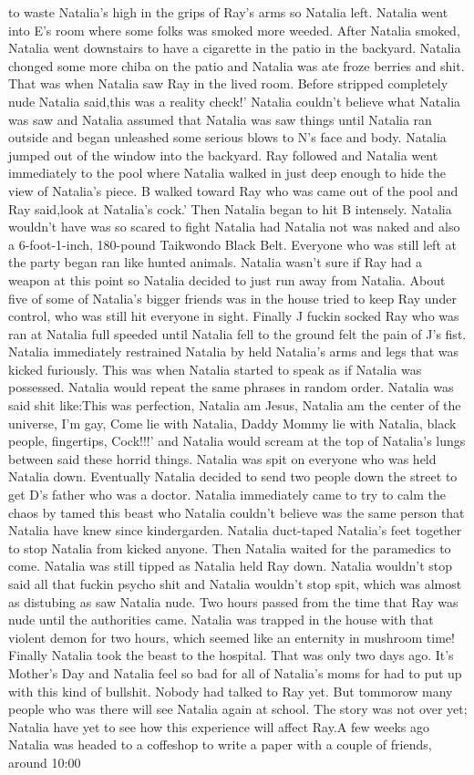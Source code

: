 \documentclass[12pt]{book}
\begin{document}
to waste Natalia's high in the grips of Ray's arms so Natalia left. Natalia went into E's room where some folks was smoked more weeded. After Natalia smoked, Natalia went downstairs to have a cigarette in the patio in the backyard. Natalia chonged some more chiba on the patio and Natalia was ate froze berries and shit. That was when Natalia saw Ray in the lived room. Before stripped completely nude Natalia said,this was a reality check!' Natalia couldn't believe what Natalia was saw and Natalia assumed that Natalia was saw things until Natalia ran outside and began unleashed some serious blows to N's face and body. Natalia jumped out of the window into the backyard. Ray followed and Natalia went immediately to the pool where Natalia walked in just deep enough to hide the view of Natalia's piece. B walked toward Ray who was came out of the pool and Ray said,look at Natalia's cock.' Then Natalia began to hit B intensely. Natalia wouldn't have was so scared to fight Natalia had Natalia not was naked and also a 6-foot-1-inch, 180-pound Taikwondo Black Belt. Everyone who was still left at the party began ran like hunted animals. Natalia wasn't sure if Ray had a weapon at this point so Natalia decided to just run away from Natalia. About five of some of Natalia's bigger friends was in the house tried to keep Ray under control, who was still hit everyone in sight. Finally J fuckin socked Ray who was ran at Natalia full speeded until Natalia fell to the ground felt the pain of J's fist. Natalia immediately restrained Natalia by held Natalia's arms and legs that was kicked furiously. This was when Natalia started to speak as if Natalia was possessed. Natalia would repeat the same phrases in random order. Natalia was said shit like:This was perfection, Natalia am Jesus, Natalia am the center of the universe, I'm gay, Come lie with Natalia, Daddy Mommy lie with Natalia, black people, fingertips, Cock!!!' and Natalia would scream at the top of Natalia's lungs between said these horrid things. Natalia was spit on everyone who was held Natalia down. Eventually Natalia decided to send two people down the street to get D's father who was a doctor. Natalia immediately came to try to calm the chaos by tamed this beast who Natalia couldn't believe was the same person that Natalia have knew since kindergarden. Natalia duct-taped Natalia's feet together to stop Natalia from kicked anyone. Then Natalia waited for the paramedics to come. Natalia was still tipped as Natalia held Ray down. Natalia wouldn't stop said all that fuckin psycho shit and Natalia wouldn't stop spit, which was almost as distubing as saw Natalia nude. Two hours passed from the time that Ray was nude until the authorities came. Natalia was trapped in the house with that violent demon for two hours, which seemed like an enternity in mushroom time! Finally Natalia took the beast to the hospital. That was only two days ago. It's Mother's Day and Natalia feel so bad for all of Natalia's moms for had to put up with this kind of bullshit. Nobody had talked to Ray yet. But tommorow many people who was there will see Natalia again at school. The story was not over yet; Natalia have yet to see how this experience will affect Ray.A few weeks ago Natalia was headed to a coffeshop to write a paper with a couple of friends, around 10:00 
\end{document}
